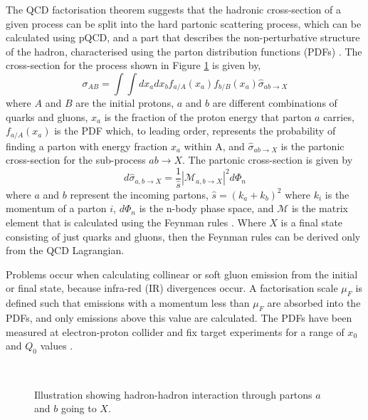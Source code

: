 The QCD factorisation theorem suggests that the hadronic cross-section of a given process can be split into the hard partonic scattering process, which can be calculated using pQCD, and a part that describes the non-perturbative structure of the hadron, characterised using the parton distribution functions (PDFs) \cite{ref:HardInt}.
The cross-section for the process shown in Figure \ref{Theory:HadronHadron} is given by,
\begin{equation}
\sigma_{AB}=\int\int dx_a dx_b f_{a/A}(x_a) f_{b/B}(x_a) \hat{\sigma}_{ab\rightarrow X}
\label{Theory:XSec}
\end{equation}
where $A$ and $B$ are the initial protons, $a$ and $b$ are different combinations of quarks and gluons, $x_a$ is the fraction of the proton energy that parton $a$ carries, $ f_{a/A}(x_a)$ is the PDF which, to leading order, represents the probability of finding a parton with energy fraction  $x_a$ within A, and $\hat{\sigma}_{ab\rightarrow X}$ is the partonic cross-section for the sub-process $ab\rightarrow X$.
The partonic cross-section is given by
\begin{equation}
d \hat{\sigma}_{a,b\rightarrow X}= \frac{1}{\hat{s}}|\mathcal{M}_{a,b\rightarrow X}|^{2} d\Phi_n
\label{Theory:PartonCrossSection}
\end{equation}
where $a$ and $b$ represent the incoming partons, $\hat{s}= (k_a + k_b)^2$ where $k_i$ is the momentum of a parton $i$, $d\Phi_n$ is the n-body phase space, and $\mathcal{M}$ is the matrix element that is calculated using the Feynman rules \cite{ref:Webber}.
Where $X$ is a final state consisting of just quarks and gluons, then the Feynman rules can be derived only from the QCD Lagrangian. 

Problems occur when calculating collinear or soft gluon emission from the initial or final state, because infra-red (IR) divergences occur.  
A factorisation scale $\mu_F$ is defined such that emissions with a momentum less than $\mu_F$ are absorbed into the PDFs, and only emissions above this value are calculated. 
The PDFs have been measured at electron-proton collider and fix target experiments for a range of $x_0$ and $Q_0$ values \cite{ref:PDF1,ref:PDF2,ref:MRST}. 

\begin{figure}
\centering
\mbox{
                              }
\caption[Illustration of a hadron-hadron interaction]{
Illustration showing hadron-hadron interaction through partons $a$ and $b$ going to $X$. 
\label{Theory:HadronHadron}}
\end{figure}


